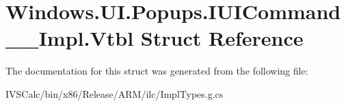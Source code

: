 \hypertarget{struct_windows_1_1_u_i_1_1_popups_1_1_i_u_i_command_____impl_1_1_vtbl}{}\section{Windows.\+U\+I.\+Popups.\+I\+U\+I\+Command\+\_\+\+\_\+\+Impl.\+Vtbl Struct Reference}
\label{struct_windows_1_1_u_i_1_1_popups_1_1_i_u_i_command_____impl_1_1_vtbl}


The documentation for this struct was generated from the following file\+:\begin{DoxyCompactItemize}
\item 
I\+V\+S\+Calc/bin/x86/\+Release/\+A\+R\+M/ilc/Impl\+Types.\+g.\+cs\end{DoxyCompactItemize}
